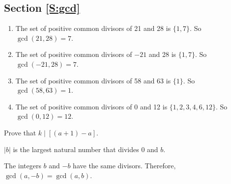\subsection*{Section \ref{S:gcd}}

\begin{list}{\bf{\ref{exer:sec81-1}.}}
\item \begin{enumerate}%
\item The set of positive common divisors of 21 and 28 is $\{1, 7\}$.  So \\$\gcd ( {21, 28} ) = 7$.

\item The set of positive common divisors of $-21$ and 28 is $\{1, 7\}$.  So \\$\gcd ( { - 21, 28} ) = 7$.

\item The set of positive common divisors of 58 and 63 is $\{1 \}$.  So \\$\gcd ( {58, 63} ) = 1$.

\item The set of positive common divisors of 0 and 12 is $\{1, 2, 3, 4, 6, 12 \}$.  So $\gcd ( {0, 12} ) = 12$.
\end{enumerate}
\end{list}


\begin{list}{\bf{\ref{exer:sec81-2}.}}
\item \begin{list}{\bf{(a)}}
\item \hint  Prove that $k \mid \left[ ( {a+1} ) - a \right]$.
\end{list}
\end{list}


\begin{list}{\bf{\ref{exer:sec81-props}.}}
\item \begin{list}{\bf{(a)}}
\item $|b|$ is the largest natural number that divides 0 and $b$.
\end{list}
\end{list}

\begin{list}{}
\item \begin{list}{\bf{(b)}}
\item The integers $b$ and $-b$ have the same divisors.  Therefore, 
$\gcd ( a, -b ) = \gcd ( a, b )$.
\end{list}
\end{list}


